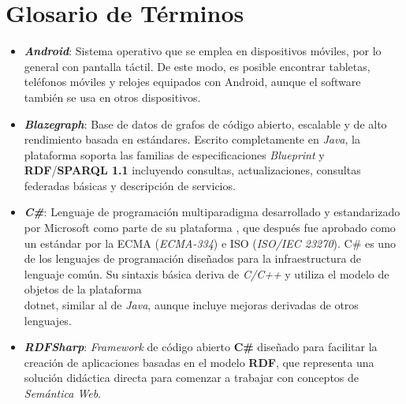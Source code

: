 
\section{Glosario de Términos}
\begin{itemize}


    \item \textbf{\textit{Android}}: Sistema operativo que se emplea 
    en dispositivos móviles, por lo general con pantalla táctil. 
    De este modo, es posible encontrar tabletas, teléfonos móviles 
    y relojes equipados con Android, aunque el software también 
    se usa en otros dispositivos. 

    \item \textbf{\textit{Blazegraph}}: Base de datos de grafos de 
    código abierto, escalable y de alto rendimiento basada en 
    estándares. Escrito completamente en \emph{Java}, la plataforma soporta 
    las familias de especificaciones \emph{Blueprint} y \textbf{RDF}/\textbf{SPARQL 1.1}
    incluyendo consultas, actualizaciones, consultas federadas básicas
    y descripción de servicios. 
    
    \item \textbf{\textit{C\#}}: Lenguaje de programación multiparadigma 
    desarrollado y estandarizado por Microsoft como parte de su 
    plataforma \textbf{\dotnet}, que después fue aprobado como un estándar por la
    ECMA (\emph{ECMA-334}) e ISO (\emph{ISO/IEC 23270}). 
    C\# es uno de los lenguajes de programación diseñados para la 
    infraestructura de lenguaje común. Su sintaxis básica deriva de 
    \emph{C/C++} y utiliza el modelo de objetos de la plataforma \\dotnet, 
    similar al de \emph{Java}, aunque incluye mejoras derivadas de otros lenguajes.


    \item \textbf{\textit{RDFSharp}}: \emph{Framework} de código 
    abierto \textbf{C\#} diseñado para facilitar la creación de 
    aplicaciones \emph{\dotnet} basadas en el modelo \textbf{RDF}, 
    que representa una solución didáctica directa para comenzar 
    a trabajar con conceptos de \emph{Semántica Web}.


\end{itemize}
